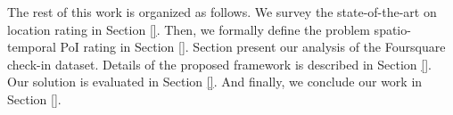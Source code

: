 The rest of this work is organized as follows. We survey the state-of-the-art on location rating in Section \ref{}. Then, we formally define the problem spatio-temporal PoI rating in Section \ref{}. Section present our analysis of the Foursquare check-in dataset. Details of the proposed framework is described in Section \ref{}. Our solution is evaluated in Section \ref{}. And finally, we conclude our work in Section \ref{}.  